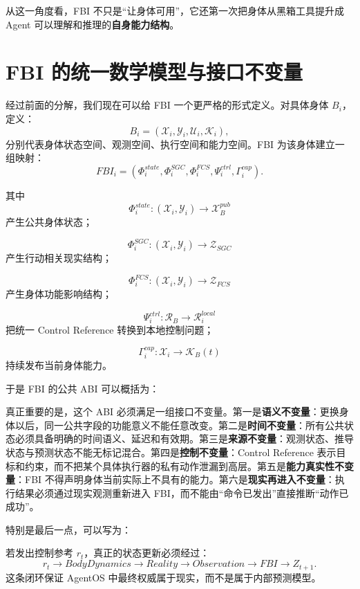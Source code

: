 从这一角度看，FBI 不只是“让身体可用”，它还第一次把身体从黑箱工具提升成 Agent 可以理解和推理的\textbf{自身能力结构}。


\section{FBI 的统一数学模型与接口不变量}

经过前面的分解，我们现在可以给 FBI 一个更严格的形式定义。对具体身体 \(B_i\)，定义：
\[
B_i
=
(
\mathcal X_i,
\mathcal Y_i,
\mathcal U_i,
\mathcal K_i
),
\]
分别代表身体状态空间、观测空间、执行空间和能力空间。FBI 为该身体建立一组映射：
\[
FBI_i
=
(
\Phi_i^{state},
\Phi_i^{SGC},
\Phi_i^{FCS},
\Psi_i^{ctrl},
\Gamma_i^{cap}
).
\]

其中
\[
\Phi_i^{state}:
(\mathcal X_i,\mathcal Y_i)
\rightarrow
\mathcal X_B^{pub}
\]
产生公共身体状态；

\[
\Phi_i^{SGC}:
(\mathcal X_i,\mathcal Y_i)
\rightarrow
\mathcal Z_{SGC}
\]
产生行动相关现实结构；

\[
\Phi_i^{FCS}:
(\mathcal X_i,\mathcal Y_i)
\rightarrow
\mathcal Z_{FCS}
\]
产生身体功能影响结构；

\[
\Psi_i^{ctrl}:
\mathcal R_B
\rightarrow
\mathcal R_i^{local}
\]
把统一 Control Reference 转换到本地控制问题；

\[
\Gamma_i^{cap}:
\mathcal X_i
\rightarrow
\mathcal K_B(t)
\]
持续发布当前身体能力。

于是 FBI 的公共 ABI 可以概括为：
\begin{statementbox}
\centering
{}
\end{statementbox}

真正重要的是，这个 ABI 必须满足一组接口不变量。第一是\textbf{语义不变量}：更换身体以后，同一公共字段的功能意义不能任意改变。第二是\textbf{时间不变量}：所有公共状态必须具备明确的时间语义、延迟和有效期。第三是\textbf{来源不变量}：观测状态、推导状态与预测状态不能无标记混合。第四是\textbf{控制不变量}：Control Reference 表示目标和约束，而不把某个具体执行器的私有动作泄漏到高层。第五是\textbf{能力真实性不变量}：FBI 不得声明身体当前实际上不具有的能力。第六是\textbf{现实再进入不变量}：执行结果必须通过现实观测重新进入 FBI，而不能由“命令已发出”直接推断“动作已成功”。

特别是最后一点，可以写为：
\begin{statementbox}
\centering
{}
\end{statementbox}
若发出控制参考 \(r_t\)，真正的状态更新必须经过：
\[
r_t
\rightarrow
BodyDynamics
\rightarrow
Reality
\rightarrow
Observation
\rightarrow
FBI
\rightarrow
Z_{t+1}.
\]
这条闭环保证 AgentOS 中最终权威属于现实，而不是属于内部预测模型。

